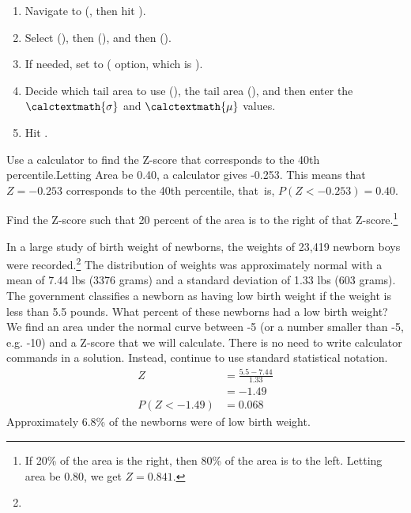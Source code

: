 \begin{termBox}{
\begin{enumerate}
\setlength{\itemsep}{0mm}
\setlength{\itemsep}{0mm}
\item Navigate to  (, then hit ).
\item Select  (), then  (), and then  ().
\item If needed, set  to  ( option, which is ).
\item Decide which tail area to use (), the tail area (), and then enter the $\calctextmath{\sigma}$ and $\calctextmath{\mu}$ values.
\item Hit .
\end{enumerate}
}
\end{termBox}

\begin{example}{Use a calculator to find the Z-score that corresponds to the 40th percentile.}Letting Area be 0.40, a calculator gives -0.253. This means that $Z = -0.253$ corresponds to the 40th percentile, that~is, $P(Z < -0.253) = 0.40$.
\end{example}

\begin{exercise}Find the Z-score such that 20 percent of the area is to the right of that Z-score.\footnote{If 20\% of the area is the right, then 80\% of the area is to the left. Letting area be 0.80, we get $Z = 0.841$.}
\end{exercise}	

\begin{example}{In a large study of birth weight of newborns, the weights of 23,419 newborn boys were recorded.\footnote{} The distribution of weights was approximately normal with a mean of 7.44 lbs (3376 grams) and a standard deviation of 1.33 lbs (603 grams). The government classifies a newborn as having low birth weight if the weight is less than 5.5 pounds. What percent of these newborns had a low birth weight?}
We find an area under the normal curve between -5 (or a number smaller than -5, e.g. -10) and a Z-score that we will calculate. There is no need to write calculator commands in a solution. Instead, continue to use standard statistical notation. 
\begin{align*}
Z&=\frac{5.5-7.44}{1.33}\\
&=-1.49\\
P(Z < -1.49) &= 0.068
\end{align*}
Approximately 6.8\% of the newborns were of low birth weight.
\end{example}

